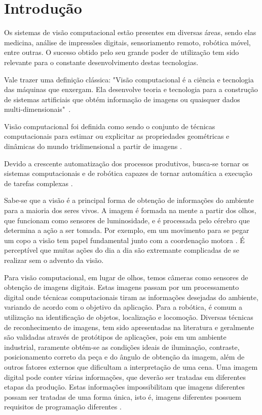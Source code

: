 \chapter{Introdução}
\label{chap:intro}

Os sistemas de visão computacional estão presentes em diversas áreas, sendo elas medicina, análise de impressões digitais, sensoriamento remoto, robótica móvel, entre outras. O sucesso obtido pelo seu grande poder de utilização tem sido relevante para o constante desenvolvimento destas tecnologias.

Vale trazer uma definição clássica: "Visão computacional é a ciência e tecnologia das máquinas que enxergam. Ela desenvolve teoria e tecnologia para a construção de sistemas artificiais que obtém informação de imagens ou quaisquer dados multi-dimensionais"~\cite{antonello2014introduccao}.

Visão computacional foi definida como sendo o conjunto de técnicas computacionais para estimar ou explicitar as propriedades geométricas e dinâmicas do mundo tridimensional a partir de imagens \cite{alves2005estudo}.

Devido a crescente automatização dos processos produtivos, busca-se tornar os sistemas computacionais e de robótica capazes de tornar automática a execução de tarefas complexas \cite{rudek2001visao}.

Sabe-se que a visão é a principal forma de obtenção de informações do ambiente para a maioria dos seres vivos. A imagem é formada na mente a partir dos olhos, que funcionam como sensores de luminosidade, e é processada pelo cérebro que determina a ação a ser tomada. Por exemplo, em um movimento para se pegar um copo a visão tem papel fundamental junto com a coordenação motora \cite{alves2005estudo}. É perceptível que muitas ações do dia a dia são extremante complicadas de se realizar sem o advento da visão.

Para visão computacional, em lugar de olhos, temos câmeras como sensores de obtenção de imagens digitais. Estas imagens passam por um processamento digital onde técnicas computacionais tiram as informações desejadas do ambiente, variando de acordo com o objetivo da aplicação. Para a robótica, é comum a utilização na identificação de objetos, localização e locomoção. Diversas técnicas de reconhecimento de imagens, tem sido apresentadas na literatura e geralmente são validadas através de protótipos de aplicações, pois em um ambiente industrial, raramente obtém-se as condições ideais de iluminação, contraste, posicionamento correto da peça e do ângulo de obtenção da imagem, além de outros fatores externos que dificultam a interpretação de uma cena. Uma imagem digital pode conter várias informações, que deverão ser tratadas em diferentes etapas da produção. Estas informações impossibilitam que imagens diferentes possam ser tratadas de uma forma única, isto é, imagens diferentes possuem requisitos de programação diferentes \cite{rudek2001visao}.

